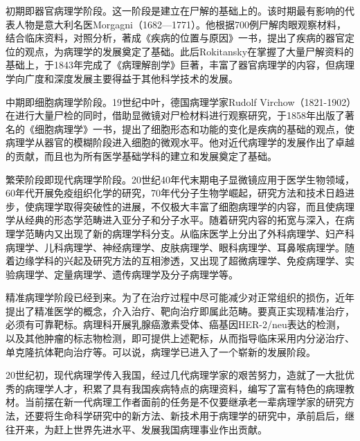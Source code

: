 初期即器官病理学阶段。这一阶段是建立在尸解的基础上的。该时期最有影响的代表人物是意大利名医Morgagni（1682---1771）。他根据700例尸解肉眼观察材料，结合临床资料，对照分析，著成《疾病的位置与原因》一书，提出了疾病的器官定位的观点，为病理学的发展奠定了基础。此后Rokitansky在掌握了大量尸解资料的基础上，于1843年完成了《病理解剖学》巨著，丰富了器官病理学的内容，但病理学向广度和深度发展主要得益于其他科学技术的发展。

中期即细胞病理学阶段。19世纪中叶，德国病理学家Rudolf
Virchow（1821-1902）在进行大量尸检的同时，借助显微镜对尸检材料进行观察研究，于1858年出版了著名的《细胞病理学》一书，提出了细胞形态和功能的变化是疾病的基础的观点，使病理学从器官的模糊阶段进入细胞的微观水平。他对近代病理学的发展作出了卓越的贡献，而且也为所有医学基础学科的建立和发展奠定了基础。

繁荣阶段即现代病理学阶段。20世纪40年代末期电子显微镜应用于医学生物领域，60年代开展免疫组织化学的研究，70年代分子生物学崛起，研究方法和技术日趋进步，使病理学取得突破性的进展，不仅极大丰富了细胞病理学的内容，而且使病理学从经典的形态学范畴进入亚分子和分子水平。随着研究内容的拓宽与深入，在病理学范畴内又出现了新的病理学科分支。从临床医学上分出了外科病理学、妇产科病理学、儿科病理学、神经病理学、皮肤病理学、眼科病理学、耳鼻喉病理学。随着边缘学科的兴起及研究方法的互相渗透，又出现了超微病理学、免疫病理学、实验病理学、定量病理学、遗传病理学及分子病理学等。

精准病理学阶段已经到来。为了在治疗过程中尽可能减少对正常组织的损伤，近年提出了精准医学的概念，介入治疗、靶向治疗即属此范畴。要真正实现精准治疗，必须有可靠靶标。病理科开展乳腺癌激素受体、癌基因HER-2/neu表达的检测，以及其他肿瘤的标志物检测，即可提供上述靶标，从而指导临床采用内分泌治疗、单克隆抗体靶向治疗等。可以说，病理学已进入了一个崭新的发展阶段。

20世纪初，现代病理学传入我国，经过几代病理学家的艰苦努力，造就了一大批优秀的病理学人才，积累了具有我国疾病特点的病理资料，编写了富有特色的病理教材。当前摆在新一代病理工作者面前的任务是不仅要继承老一辈病理学家的研究方法，还要将生命科学研究中的新方法、新技术用于病理学的研究中，承前启后，继往开来，为赶上世界先进水平、发展我国病理事业作出贡献。